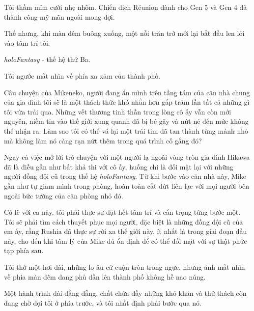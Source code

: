 \documentclass[../main.tex]{subfiles}
\begin{document}
Tôi thầm mỉm cười nhẹ nhõm. Chiến dịch Réunion dành cho Gen 5 và Gen 4 đã thành công mỹ mãn ngoài mong đợi.

Thế nhưng, khi màn đêm buông xuống, một nỗi trăn trở mới lại bắt đầu len lỏi vào tâm trí tôi.

\textit{holoFantasy} - thế hệ thứ Ba.

Tôi ngước mắt nhìn về phía xa xăm của thành phố.

Câu chuyện của Mikeneko, người đang ẩn mình trên tầng tám của căn nhà chung của gia đình tôi sẽ là một thách thức khó nhằn hơn gấp trăm lần tất cả những gì tôi vừa trải qua. Những vết thương tinh thần trong lòng cô ấy vẫn còn mới nguyên, niềm tin vào thế giới xung quanh đã bị bẻ gãy và nứt nẻ đến mức không thể nhận ra. Làm sao tôi có thể vá lại một trái tim đã tan thành từng mảnh nhỏ mà không làm nó càng rạn nứt thêm trong quá trình cố gắng đó?

Ngay cả việc mở lời trò chuyện với một người lạ ngoài vòng tròn gia đình Hikawa đã là điều gần như bất khả thi với cô ấy, huống chi là đối mặt lại với những người đồng đội cũ trong thế hệ \textit{holoFantasy}. Từ khi bước vào căn nhà này, Mike gần như tự giam mình trong phòng, hoàn toàn cắt đứt liên lạc với mọi người bên ngoài bức tường của căn phòng nhỏ đó.

Có lẽ với ca này, tôi phải thực sự đặt hết tâm trí và cẩn trọng từng bước một. Tôi sẽ phải tìm cách thuyết phục mọi người, đặc biệt là những đồng đội cũ của em ấy, rằng Rushia đã thực sự rời xa thế giới này, ít nhất là trong giai đoạn đầu này, cho đến khi tâm lý của Mike đủ ổn định để có thể đối mặt với sự thật phức tạp phía sau.

Tôi thở một hơi dài, những lo âu cứ cuộn tròn trong ngực, nhưng ánh mắt nhìn về phía màn đêm đang phủ dần lên thành phố không hề nao núng.

Một hành trình dài đằng đẵng, chất chứa đầy những khó khăn và thử thách còn đang chờ đợi tôi ở phía trước, và tôi nhất định phải bước qua nó.
\end{document}
